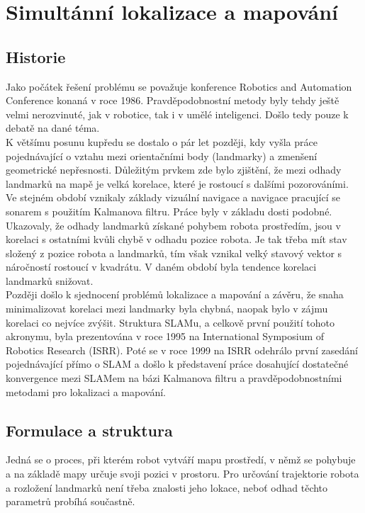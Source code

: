 \documentclass[11pt]{article}
\begin{document}
\newpage

\section{Simultánní lokalizace a mapování}

\subsection{Historie}
Jako počátek řešení problému se považuje konference Robotics and Automation Conference konaná v roce 1986. Pravděpodobnostní metody byly tehdy ještě velmi nerozvinuté, jak v robotice, tak i v umělé inteligenci. Došlo tedy pouze k debatě na dané téma.\\
\indent K většímu posunu kupředu se dostalo o pár let později, kdy vyšla práce pojednávající o vztahu mezi orientačními body (landmarky) a zmenšení geometrické nepřesnosti. Důležitým prvkem zde bylo zjištění, že mezi odhady landmarků na mapě je velká korelace, které je rostoucí s dalšími pozorováními.\\
\indent Ve stejném období vznikaly základy vizuální navigace a navigace pracující se sonarem s použitím Kalmanova filtru. Práce byly v základu dosti podobné. Ukazovaly, že odhady landmarků získané pohybem robota prostředím, jsou v korelaci s ostatními kvůli chybě v odhadu pozice robota. Je tak třeba mít stav složený z pozice robota a landmarků, tím však vznikal velký stavový vektor s náročností rostoucí v kvadrátu. V daném období byla tendence korelaci landmarků snižovat.\\
\indent Později došlo k sjednocení problémů lokalizace a mapování a závěru, že snaha minimalizovat korelaci mezi landmarky byla chybná, naopak bylo v zájmu korelaci co nejvíce zvýšit. Struktura SLAMu, a celkově první použití tohoto akronymu, byla prezentována v roce 1995 na International Symposium of Robotics Research (ISRR). Poté se v roce 1999 na ISRR odehrálo první zasedání pojednávající přímo o SLAM a došlo k představení práce dosahující dostatečné konvergence mezi SLAMem na bázi Kalmanova filtru a pravděpodobnostními metodami pro lokalizaci a mapování.


\subsection{Formulace a struktura} 
Jedná se o proces, při kterém robot vytváří mapu prostředí, v němž se pohybuje a na základě mapy určuje svoji pozici v prostoru. Pro určování trajektorie robota a rozložení landmarků není třeba znalosti jeho lokace, neboť odhad těchto parametrů probíhá součastně. 
\end{document}
